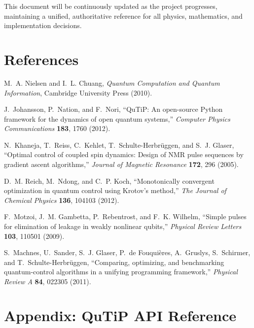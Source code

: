 \documentclass[11pt,a4paper]{article}
\theoremstyle{definition}
\theoremstyle{remark}
\begin{document}
This document will be continuously updated as the project progresses, maintaining a unified, authoritative reference for all physics, mathematics, and implementation decisions.

\section*{References}

\begin{enumerate}[label={[\arabic*]}]
    \item M.~A. Nielsen and I.~L. Chuang, \emph{Quantum Computation and Quantum Information}, Cambridge University Press (2010).
    \item J.~Johansson, P.~Nation, and F.~Nori, ``QuTiP: An open-source Python framework for the dynamics of open quantum systems,'' \emph{Computer Physics Communications} \textbf{183}, 1760 (2012).
    \item N.~Khaneja, T.~Reiss, C.~Kehlet, T.~Schulte-Herbr\"uggen, and S.~J. Glaser, ``Optimal control of coupled spin dynamics: Design of NMR pulse sequences by gradient ascent algorithms,'' \emph{Journal of Magnetic Resonance} \textbf{172}, 296 (2005).
    \item D.~M. Reich, M.~Ndong, and C.~P. Koch, ``Monotonically convergent optimization in quantum control using Krotov's method,'' \emph{The Journal of Chemical Physics} \textbf{136}, 104103 (2012).
    \item F.~Motzoi, J.~M. Gambetta, P.~Rebentrost, and F.~K. Wilhelm, ``Simple pulses for elimination of leakage in weakly nonlinear qubits,'' \emph{Physical Review Letters} \textbf{103}, 110501 (2009).
    \item S.~Machnes, U.~Sander, S.~J. Glaser, P.~de Fouquières, A.~Gruslys, S.~Schirmer, and T.~Schulte-Herbr\"uggen, ``Comparing, optimizing, and benchmarking quantum-control algorithms in a unifying programming framework,'' \emph{Physical Review A} \textbf{84}, 022305 (2011).
\end{enumerate}

\appendix
\section{Appendix: QuTiP API Reference}
\label{app:qutip}
\end{document}
